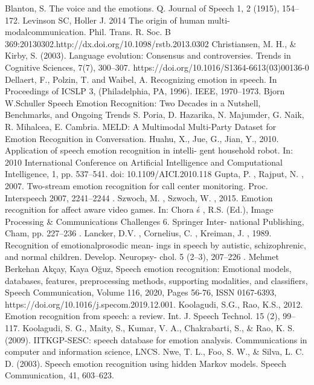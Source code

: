 \documentclass[a4paper,12pt, twoside]{book}
\begin{document}
	\begin{thebibliography}{9}
			Blanton, S. The voice and the emotions. Q. Journal of Speech 1, 2 (1915), 154–172.
			Levinson SC, Holler J. 2014 The origin of human multi-modalcommunication. Phil. Trans. R. Soc. B 369:20130302.http://dx.doi.org/10.1098/rstb.2013.0302
			Christiansen, M. H., \& Kirby, S. (2003). Language evolution: Consensus and controversies. Trends in Cognitive Sciences, 7(7), 300–307. https://doi.org/10.1016/S1364-6613(03)00136-0
			Dellaert, F., Polzin, T. and Waibel, A. Recognizing emotion in speech. In Proceedings of ICSLP 3, (Philadelphia, 	PA, 1996). IEEE, 1970–1973.
			Bjorn W.Schuller Speech Emotion Recognition: Two Decades in a Nutshell, Benchmarks, and Ongoing Trends
			S. Poria, D. Hazarika, N. Majumder, G. Naik, R. Mihalcea, E. Cambria. MELD: A Multimodal Multi-Party Dataset for Emotion Recognition in Conversation.
			Huahu, X., Jue, G., Jian, Y., 2010. Application of speech emotion recognition in intelli-
			gent household robot. In: 2010 International Conference on Artificial Intelligence and
			Computational Intelligence, 1, pp. 537–541. doi: 10.1109/AICI.2010.118
			Gupta, P. , Rajput, N. , 2007. Two-stream emotion recognition for call center monitoring.
			Proc. Interspeech 2007, 2241–2244 .
			Szwoch, M. , Szwoch, W. , 2015. Emotion recognition for affect aware video games. In:
			Chora ś , R.S. (Ed.), Image Processing \& Communications Challenges 6. Springer Inter-
			national Publishing, Cham, pp. 227–236 .
			Lancker, D.V. , Cornelius, C. , Kreiman, J. , 1989. Recognition of emotionalprosodic mean-
			ings in speech by autistic, schizophrenic, and normal children. Develop. Neuropsy-
			chol. 5 (2–3), 207–226 .
			Mehmet Berkehan Akçay, Kaya Oğuz, Speech emotion recognition: Emotional models, databases, features, preprocessing methods, supporting modalities, and classifiers, Speech Communication, Volume 116, 2020, Pages 56-76, ISSN 0167-6393, https://doi.org/10.1016/j.specom.2019.12.001.
			Koolagudi, S.G., Rao, K.S., 2012. Emotion recognition from speech: a review. Int. J. Speech Technol. 15 (2), 99–117.
			Koolagudi, S. G., Maity, S., Kumar, V. A., Chakrabarti, S., \& Rao,	K. S. (2009). IITKGP-SESC: speech database for emotion analysis. Communications in computer and information science, LNCS.
			Nwe, T. L., Foo, S. W., \& Silva, L. C. D. (2003). Speech emotion recognition using hidden Markov models. Speech Communication, 41, 603–623.

\end{thebibliography}
\end{document}
